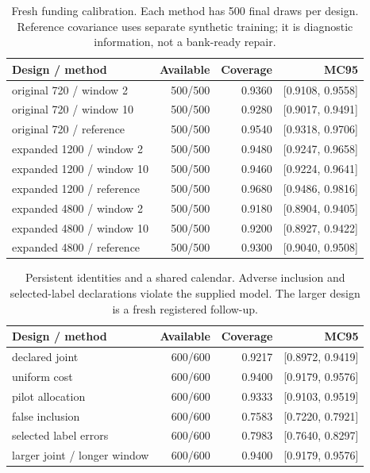 \begin{table}[htbp]
\centering\small
\begin{tabular}{lrrr}
\toprule
Design / method & Available & Coverage & MC95 \\
\midrule
original 720 / window 2 & 500/500 & 0.9360 & [0.9108, 0.9558] \\
original 720 / window 10 & 500/500 & 0.9280 & [0.9017, 0.9491] \\
original 720 / reference & 500/500 & 0.9540 & [0.9318, 0.9706] \\
expanded 1200 / window 2 & 500/500 & 0.9480 & [0.9247, 0.9658] \\
expanded 1200 / window 10 & 500/500 & 0.9460 & [0.9224, 0.9641] \\
expanded 1200 / reference & 500/500 & 0.9680 & [0.9486, 0.9816] \\
expanded 4800 / window 2 & 500/500 & 0.9180 & [0.8904, 0.9405] \\
expanded 4800 / window 10 & 500/500 & 0.9200 & [0.8927, 0.9422] \\
expanded 4800 / reference & 500/500 & 0.9300 & [0.9040, 0.9508] \\
\bottomrule
\end{tabular}
\caption{Fresh funding calibration. Each method has 500 final draws per design. Reference covariance uses separate synthetic training; it is diagnostic information, not a bank-ready repair.}
\label{r8:calibration-table}
\end{table}

\begin{table}[htbp]
\centering\small
\begin{tabular}{lrrr}
\toprule
Design / method & Available & Coverage & MC95 \\
\midrule
declared joint & 600/600 & 0.9217 & [0.8972, 0.9419] \\
uniform cost & 600/600 & 0.9400 & [0.9179, 0.9576] \\
pilot allocation & 600/600 & 0.9333 & [0.9103, 0.9519] \\
false inclusion & 600/600 & 0.7583 & [0.7220, 0.7921] \\
selected label errors & 600/600 & 0.7983 & [0.7640, 0.8297] \\
larger joint / longer window & 600/600 & 0.9400 & [0.9179, 0.9576] \\
\bottomrule
\end{tabular}
\caption{Persistent identities and a shared calendar. Adverse inclusion and selected-label declarations violate the supplied model. The larger design is a fresh registered follow-up.}
\label{r8:joint-table}
\end{table}

